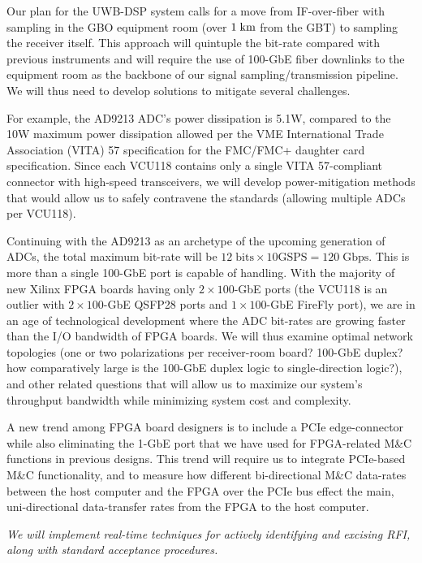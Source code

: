 \documentclass[10pt]{myNSF}
\begin{document}
Our plan for the UWB-DSP system calls for a move from IF-over-fiber
with sampling in the GBO equipment room (over $1\; \textrm{km}$ from the GBT)
to sampling the receiver itself.  This approach will quintuple the
bit-rate compared with previous instruments and will require the use
of 100-GbE fiber downlinks to the equipment room as the backbone of
our signal sampling/transmission pipeline.  We will thus need to
develop solutions to mitigate several challenges.

For example, the AD9213 ADC's power dissipation is 5.1W, compared to
the 10W maximum power dissipation allowed per the VME International
Trade Association (VITA) 57 specification for the FMC/FMC+ daughter
card specification. Since each VCU118 contains only a single VITA
57-compliant connector with high-speed transceivers, we will develop
power-mitigation methods that would allow us to safely contravene the
standards (allowing multiple ADCs per VCU118).

Continuing with the AD9213 as an archetype of the upcoming generation
of ADCs, the total maximum bit-rate will be $12\; \mathrm{bits} \times
10 \mathrm{GSPS} = 120\; \mathrm{Gbps}$.  This is more than a single
100-GbE port is capable of handling.  With the majority of new Xilinx
FPGA boards having only $2 \times 100$-GbE ports (the VCU118 is an
outlier with $2 \times100$-GbE QSFP28 ports and $1 \times 100$-GbE
FireFly port), we are in an age of technological development where the
ADC bit-rates are growing faster than the I/O bandwidth of FPGA
boards. We will thus examine optimal network topologies (one or two
polarizations per receiver-room board? 100-GbE duplex? how
comparatively large is the 100-GbE duplex logic to single-direction
logic?), and other related questions that will allow us to maximize
our system's throughput bandwidth while minimizing system cost and
complexity.

A new trend among FPGA board designers is to include a PCIe
edge-connector while also eliminating the 1-GbE port that we have used
for FPGA-related M\&C functions in previous designs. This trend will
require us to integrate PCIe-based M\&C functionality, and to measure
how different bi-directional M\&C data-rates between the host computer
and the FPGA over the PCIe bus effect the main, uni-directional
data-transfer rates from the FPGA to the host computer.


\label{sec:rfi_excision}

\emph{We will implement real-time techniques for actively identifying
  and excising RFI, along with standard acceptance procedures.}
\end{document}
